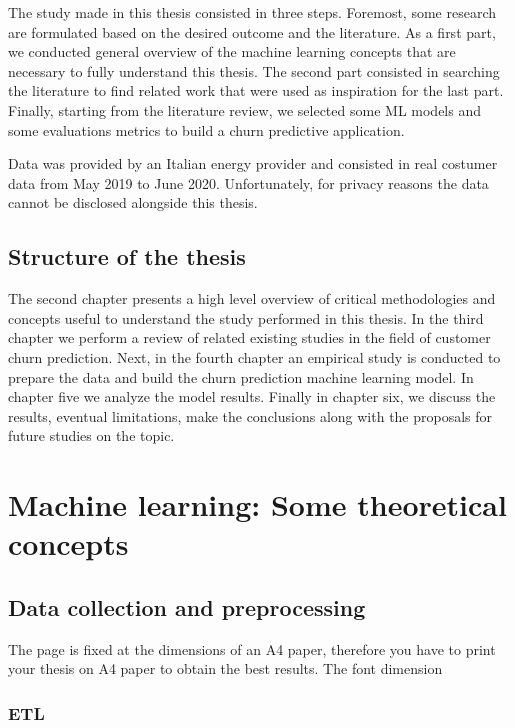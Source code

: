 \documentclass[LaM,binding=0.6cm, english]{sapthesis}
\begin{document}
The study made in this thesis consisted in three steps. Foremost, some research are formulated based on the desired outcome and the literature. As a first part, we conducted general overview of the machine learning concepts that are necessary to fully understand this thesis. The second part consisted in searching the literature to find related work that were used as inspiration for the last part. Finally, starting from the literature review, we selected some \gls{ML} models and some evaluations metrics to build a churn predictive application.

Data was provided by an Italian energy provider and consisted in real costumer data from May 2019 to June 2020. Unfortunately, for privacy reasons the data cannot be disclosed alongside this thesis.

\section{Structure of the thesis}

The second chapter presents a high level overview of critical methodologies and concepts useful to understand the study performed in this thesis. In the third chapter we perform a review of related existing studies in the field of customer churn prediction. Next, in the fourth chapter an empirical study is conducted to prepare the data and build the churn prediction machine learning model. In chapter five we analyze the model results. Finally in chapter six, we discuss the results, eventual limitations, make the conclusions along with the proposals for future studies on the topic.

\chapter{Machine learning: Some theoretical concepts}



\section{Data collection and preprocessing}

The page is fixed at the dimensions of an A4 paper, therefore you have to print your thesis on A4 paper to obtain the best results. The font dimension

\subsection{ETL}
\end{document}
